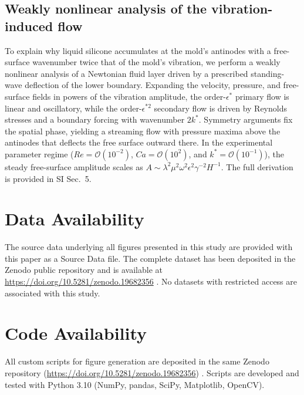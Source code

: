 \documentclass[twocolumn,letter,11pt]{article}
\begin{document}
\subsection*{Weakly nonlinear analysis of the vibration-induced flow}
To explain why liquid silicone accumulates at the mold's antinodes with a free-surface wavenumber twice that of the mold's vibration, we perform a weakly nonlinear analysis of a Newtonian fluid layer driven by a prescribed standing-wave deflection of the lower boundary. Expanding the velocity, pressure, and free-surface fields in powers of the vibration amplitude, the order-$\epsilon^*$ primary flow is linear and oscillatory, while the order-$\epsilon^{*2}$ secondary flow is driven by Reynolds stresses and a boundary forcing with wavenumber $2k^*$. Symmetry arguments fix the spatial phase, yielding a streaming flow with pressure maxima above the antinodes that deflects the free surface outward there. In the experimental parameter regime ($Re = \mathcal{O}(10^{-2})$, $Ca = \mathcal{O}(10^2)$, and $k^* = \mathcal{O}(10^{-1})$), the steady free-surface amplitude scales as $A \sim \lambda^2 \mu^2 \omega^2 \epsilon^2 \gamma^{-2} H^{-1}$. The full derivation is provided in SI Sec.~5.

\section*{Data Availability}
The source data underlying all figures presented in this study are provided with this paper as a Source Data file. The complete dataset has been deposited in the Zenodo public repository and is available at \url{https://doi.org/10.5281/zenodo.19682356} \cite{zenodo-archive}. No datasets with restricted access are associated with this study.

\section*{Code Availability}
All custom scripts for figure generation are deposited in the same Zenodo repository (\url{https://doi.org/10.5281/zenodo.19682356}) \cite{zenodo-archive}. Scripts are developed and tested with Python 3.10 (NumPy, pandas, SciPy, Matplotlib, OpenCV). 
\end{document}
